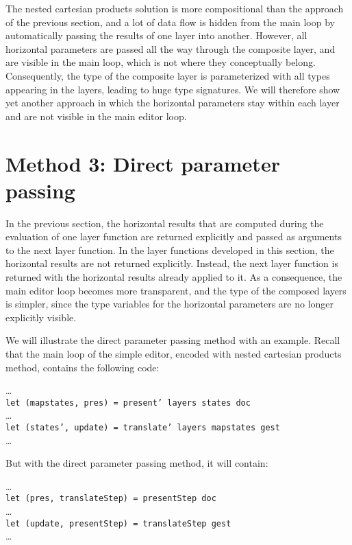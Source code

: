 The nested cartesian products solution is more compositional than the approach of the previous section, and a lot of data flow is hidden from the main loop by automatically passing the results of one layer into another. However, all horizontal parameters are passed all the way through the composite layer, and are visible in the main loop, which is not where they conceptually belong. Consequently, the type of the composite layer is parameterized with all types appearing in the layers, leading to huge type signatures. We will therefore show yet another approach in which the horizontal parameters stay within each layer and are not visible in the main editor loop.


%									
%									
%									
\section{Method 3: Direct parameter passing} \label{sectdpp}

In the previous section, the horizontal results that are computed during the evaluation of one layer function are returned explicitly and passed as arguments to the next layer function. In the layer functions developed in this section, the horizontal results are not returned explicitly. Instead, the next layer function is returned with the horizontal results already applied to it. As a consequence, the main editor loop becomes more transparent, and the type of the composed layers is simpler, since the type variables for the horizontal parameters are no longer explicitly visible.

We will illustrate the direct parameter passing method with an example. Recall that the main loop of the simple editor, encoded with nested cartesian products method, contains the following code:

\dots\\
{\tt let (mapstates, pres) = present' layers states doc}\\
\dots\\
{\tt let (states', update) = translate' layers mapstates gest}\\
\dots

But with the direct parameter passing method, it will contain:

\dots\\
{\tt let (pres, translateStep) = presentStep doc}\\
\dots\\
{\tt let (update, presentStep) = translateStep gest}\\
\dots

